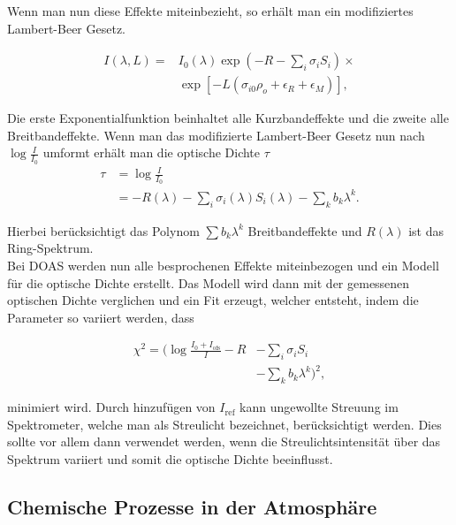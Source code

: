 \documentclass[12pt, a4paper, bibliography=totoc]{scrartcl}
\begin{document}
\begin{multicols}{2}
Wenn man nun diese Effekte miteinbezieht, so erhält man ein modifiziertes Lambert-Beer Gesetz.

\begin{align*}
    I(\lambda, L) = & I_0 (\lambda) \exp \left( -R - \sum_i \sigma_i
    S_i \right) \times \\
    & \exp \left[ - L \left( \sigma_{i0} \rho_o + \epsilon_R + \epsilon_M \right) \right], \label{eq:mod_lambert_beer_law}
\end{align*}

Die erste Exponentialfunktion beinhaltet alle Kurzbandeffekte und die zweite alle Breitbandeffekte.
Wenn man das modifizierte Lambert-Beer Gesetz nun nach $\log \frac{I}{I_0}$ umformt erhält man die optische Dichte $\tau$
\begin{align}
\tau &= \log \frac{I}{I_0} \\
    &= - R(\lambda) - \sum_i \sigma_i (\lambda) S_i (\lambda) - \sum_k b_k \lambda^k.\label{eq:optical_density}
\end{align}

Hierbei berücksichtigt das Polynom $\sum b_k \lambda^k$ Breitbandeffekte und $R(\lambda)$ ist das Ring-Spektrum.\\
Bei DOAS werden nun alle besprochenen Effekte miteinbezogen und ein Modell für die optische Dichte erstellt. 
Das Modell wird dann mit der gemessenen optischen Dichte verglichen und ein Fit erzeugt, welcher entsteht, indem die Parameter so variiert werden, dass 

\begin{align*}
    \chi^2 = ( \log \frac{I_0 + I_\text{ofs}}{I} - R & - \sum_i \sigma_i S_i \\ 
    & - \sum_k b_k \lambda^k )^2 ,
\end{align*}

minimiert wird. 
Durch hinzufügen von $I_\text{ref}$ kann ungewollte Streuung im Spektrometer, welche man als Streulicht bezeichnet, berücksichtigt werden.
Dies sollte vor allem dann verwendet werden, wenn die Streulichtsintensität über das Spektrum variiert und somit die optische Dichte beeinflusst.

\subsection{Chemische Prozesse in der Atmosphäre}\label{ssec:chemie_atmosphäre}


\end{multicols}
\end{document}
